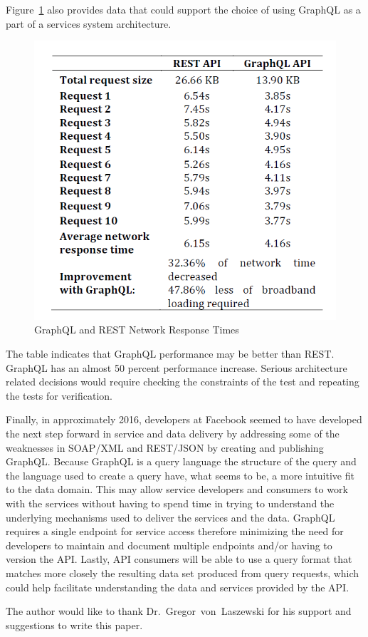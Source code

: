 Figure~\ref{f:network-response}\cite{hid505VzquezIngelmo2017ImprovingTO} also 
provides data that could support the choice of using GraphQL as a part of a 
services system architecture.  
\begin{figure}[!ht]
  \centering\includegraphics[width=\columnwidth]{images/network-response-times.png}
  \caption{GraphQL and REST Network Response Times}\label{f:network-response}
\end{figure}
The table indicates that GraphQL performance may be better than REST.  GraphQL 
has an almost 50 percent performance increase.  Serious architecture related 
decisions would require checking the constraints of the test and repeating the 
tests for verification.

Finally, in approximately 2016, developers at Facebook seemed to have 
developed the next step forward in service and data delivery by addressing some 
of the weaknesses in SOAP/XML and REST/JSON by creating and publishing GraphQL.
Because GraphQL is a query language the structure of the query and the language 
used to create a query have, what seems to be, a more intuitive fit to the data 
domain.  This may allow service developers and consumers to work with the 
services without having to spend time in trying to understand the underlying 
mechanisms used to deliver the services and the data.  GraphQL requires a 
single endpoint for service access therefore minimizing the need for developers 
to maintain and document multiple endpoints and/or having to version the API.  
Lastly, API consumers will be able to use a query format that matches more 
closely the resulting data set produced from query requests, which could help 
facilitate understanding the data and services provided by the API.

\begin{acks}

  The author would like to thank Dr.~Gregor~von~Laszewski for his
  support and suggestions to write this paper.

\end{acks}


 
